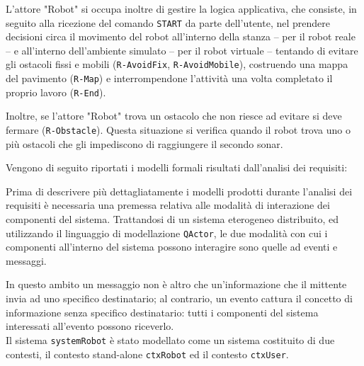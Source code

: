 \documentclass{llncs}
\newcommand{\action}[1]{\texttt{#1}\xspace}
\newcommand{\code}[1]{{\color{blue}\small{\texttt{#1}}}}
\begin{document}
L'attore "Robot" si occupa inoltre di gestire la logica applicativa, che consiste, in seguito alla ricezione del comando \action{START} da parte dell'utente, nel prendere decisioni circa il movimento del robot all'interno della stanza – per il robot reale – e all'interno dell'ambiente simulato – per il robot virtuale – tentando di evitare gli ostacoli fissi e mobili (\code{R-AvoidFix}, \code{R-AvoidMobile}), costruendo una mappa del pavimento (\code{R-Map}) e interrompendone l'attività una volta completato il proprio lavoro (\code{R-End}).

Inoltre, se l'attore "Robot" trova un ostacolo che non riesce ad evitare si deve fermare (\code{R-Obstacle}).
Questa situazione si verifica quando il robot trova uno o più ostacoli che gli impediscono di raggiungere il secondo sonar.

Vengono di seguito riportati i modelli formali risultati dall'analisi dei requisiti:




Prima di descrivere più dettagliatamente i modelli prodotti durante l'analisi dei requisiti è necessaria una premessa relativa alle modalità di interazione dei componenti del sistema. Trattandosi di un sistema eterogeneo distribuito, ed utilizzando il linguaggio di modellazione \action{QActor}, le due modalità con cui i componenti all'interno del sistema possono interagire sono quelle ad eventi e messaggi. 

In questo ambito un messaggio non è altro che un'informazione che il mittente invia ad uno specifico destinatario; al contrario, un evento cattura il concetto di informazione senza specifico destinatario: tutti i componenti del sistema interessati all'evento possono riceverlo. \\

Il sistema \action{systemRobot} è stato modellato come un sistema costituito di due contesti, il contesto stand-alone \action{ctxRobot} ed il contesto \action{ctxUser}. 
\end{document}
